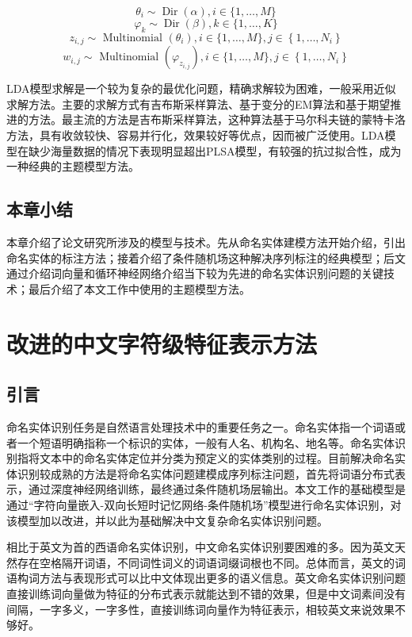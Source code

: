 \documentclass[winfonts,master,oneside,nobackinfo]{njuthesis}
\begin{document}
$$\theta _ { i } \sim \operatorname { Dir } ( \alpha ), i \in \{ 1 , \ldots , M \}$$
$$\varphi _ { k } \sim \operatorname { Dir } ( \beta ), k \in \{ 1 , \ldots , K \}$$
$$z _ { i , j } \sim \text { Multinomial } \left( \theta _ { i } \right), i \in \{ 1 , \ldots , M \},j \in \left\{ 1 , \ldots , N _ { i } \right\}$$
$$w _ { i , j } \sim \text { Multinomial } \left( \varphi _ { z _ { i , j } } \right), i \in \{ 1 , \ldots , M \},j \in \left\{ 1 , \ldots , N _ { i } \right\} $$

LDA模型求解是一个较为复杂的最优化问题，精确求解较为困难，一般采用近似求解方法。主要的求解方式有吉布斯采样算法、基于变分的EM算法和基于期望推进的方法。最主流的方法是吉布斯采样算法，这种算法基于马尔科夫链的蒙特卡洛方法，具有收敛较快、容易并行化，效果较好等优点，因而被广泛使用。LDA模型在缺少海量数据的情况下表现明显超出PLSA模型，有较强的抗过拟合性，成为一种经典的主题模型方法。

\section{本章小结}

本章介绍了论文研究所涉及的模型与技术。先从命名实体建模方法开始介绍，引出命名实体的标注方法；接着介绍了条件随机场这种解决序列标注的经典模型；后文通过介绍词向量和循环神经网络介绍当下较为先进的命名实体识别问题的关键技术；最后介绍了本文工作中使用的主题模型方法。

\chapter{改进的中文字符级特征表示方法}

\section{引言}

命名实体识别任务是自然语言处理技术中的重要任务之一。命名实体指一个词语或者一个短语明确指称一个标识的实体，一般有人名、机构名、地名等。命名实体识别指将文本中的命名实体定位并分类为预定义的实体类别的过程。目前解决命名实体识别较成熟的方法是将命名实体问题建模成序列标注问题，首先将词语分布式表示，通过深度神经网络训练，最终通过条件随机场层输出。本文工作的基础模型是通过“字符向量嵌入-双向长短时记忆网络-条件随机场”模型进行命名实体识别，对该模型加以改进，并以此为基础解决中文复杂命名实体识别问题。

相比于英文为首的西语命名实体识别，中文命名实体识别要困难的多。因为英文天然存在空格隔开词语，不同词性词义的词语词缀词根也不同。总体而言，英文的词语构词方法与表现形式可以比中文体现出更多的语义信息。英文命名实体识别问题直接训练词向量做为特征的分布式表示就能达到不错的效果，但是中文词素间没有间隔，一字多义，一字多性，直接训练词向量作为特征表示，相较英文来说效果不够好。
\end{document}

